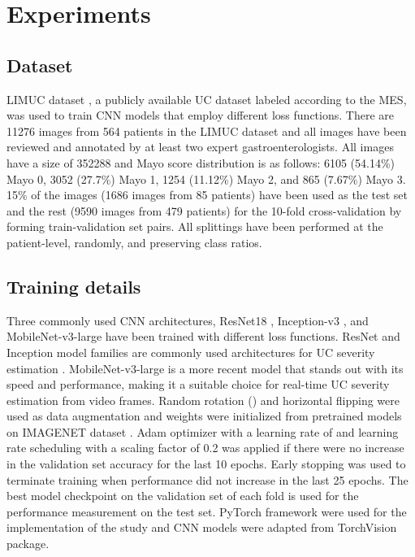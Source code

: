 \documentclass[runningheads]{llncs}
\begin{document}
\section{Experiments}

\subsection{Dataset}

LIMUC dataset \cite{gorkem_polat_2022_5827695}, a publicly available UC dataset labeled according to the MES, was used to train CNN models that employ different loss functions. There are 11276 images from 564 patients in the LIMUC dataset and all images have been reviewed and annotated by at least two expert gastroenterologists. All images have a size of 352288 and Mayo score distribution is as follows: 6105 (54.14\%) Mayo 0, 3052 (27.7\%) Mayo 1, 1254 (11.12\%) Mayo 2, and 865 (7.67\%) Mayo 3. 15\% of the images (1686 images from 85 patients) have been used as the test set and the rest (9590 images from 479 patients) for the 10-fold cross-validation by forming train-validation set pairs. All splittings have been performed at the patient-level, randomly, and preserving class ratios. 

\subsection{Training details}
Three commonly used CNN architectures, ResNet18 \cite{he2016deep}, Inception-v3 \cite{szegedy2016rethinking}, and MobileNet-v3-large \cite{howard2019searching} have been trained with different loss functions. ResNet and Inception model families are commonly used architectures for UC severity estimation \cite{stidham2019performance,ozawa2019novel,takenaka2020development,bhambhvani2021deep,gutierrez2021training,schwab2021automatic,yao2021fully}. MobileNet-v3-large is a more recent model that stands out with its speed and performance, making it a suitable choice for real-time UC severity estimation from video frames. Random rotation () and horizontal flipping were used as data augmentation and weights were initialized from pretrained models on IMAGENET dataset \cite{russakovsky2015imagenet}. Adam optimizer with a learning rate of  and learning rate scheduling with a scaling factor of 0.2 was applied if there were no increase in the validation set accuracy for the last 10 epochs. Early stopping was used to terminate training when performance did not increase in the last 25 epochs. The best model checkpoint on the validation set of each fold is used for the performance measurement on the test set. PyTorch framework \cite{paszke2019pytorch} were used for the implementation of the study and CNN models were adapted from TorchVision package.
\end{document}
